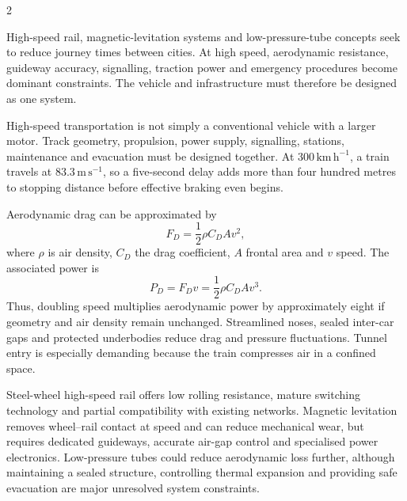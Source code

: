

\begin{multicols}{2}
\begin{engineeringnews}
High-speed rail, magnetic-levitation systems and low-pressure-tube concepts seek to reduce journey times between
cities. At high speed, aerodynamic resistance, guideway accuracy, signalling, traction power and emergency
procedures become dominant constraints. The vehicle and infrastructure must therefore be designed as one system.
\end{engineeringnews}

\begin{ecarticle}
High-speed transportation is not simply a conventional vehicle with a larger motor. Track geometry, propulsion,
power supply, signalling, stations, maintenance and evacuation must be designed together. At $300\,\mathrm{km\,h^{-1}}$,
a train travels at $83.3\,\mathrm{m\,s^{-1}}$, so a five-second delay adds more than four hundred metres to stopping
distance before effective braking even begins.

Aerodynamic drag can be approximated by
\[
F_D=\frac{1}{2}\rho C_D A v^2,
\]
where $\rho$ is air density, $C_D$ the drag coefficient, $A$ frontal area and $v$ speed. The associated power is
\[
P_D=F_Dv=\frac{1}{2}\rho C_D A v^3.
\]
Thus, doubling speed multiplies aerodynamic power by approximately eight if geometry and air density remain
unchanged. Streamlined noses, sealed inter-car gaps and protected underbodies reduce drag and pressure fluctuations.
Tunnel entry is especially demanding because the train compresses air in a confined space.

Steel-wheel high-speed rail offers low rolling resistance, mature switching technology and partial compatibility
with existing networks. Magnetic levitation removes wheel--rail contact at speed and can reduce mechanical wear,
but requires dedicated guideways, accurate air-gap control and specialised power electronics. Low-pressure tubes
could reduce aerodynamic loss further, although maintaining a sealed structure, controlling thermal expansion and
providing safe evacuation are major unresolved system constraints.


\end{ecarticle}
\end{multicols}
